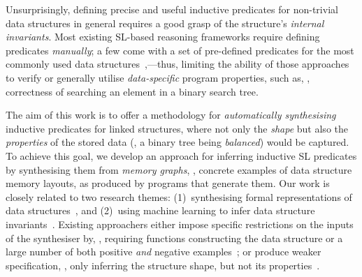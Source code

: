 %
%
Unsurprisingly, defining precise and useful inductive predicates for
non-trivial data structures in general requires a good grasp of the
structure's \emph{internal invariants}.
%
Most existing SL-based reasoning frameworks require
defining predicates \emph{manually};
%
a few come with a set of pre-defined predicates for the most commonly
used data structures~\cite{Calcagno-al:JACM11,le2019sling},---thus, limiting the
ability of those approaches to verify or generally utilise \emph{data-specific} program
properties, such as, \eg, correctness of searching
an element in a binary search tree.



The aim of this work is to offer a methodology for \emph{automatically
  synthesising} inductive predicates for linked structures, where not
only the \emph{shape} but also the \emph{properties} of the stored
data (\eg, a binary tree being \emph{balanced}) would be captured.
%
To achieve this goal, we develop an approach for inferring inductive
SL predicates by synthesising them from \emph{memory graphs}, \ie,
concrete examples of data structure memory layouts, as produced by
programs that generate them.
%
Our work is closely related to two research themes: (1)~synthesising
formal representations of data
structures~\cite{guo2007shape,zhu2016automatically,LPAR23:Learning_Data_Structure_Shapes,molina2021evospex},
and (2)~using machine learning to infer data structure
invariants~\cite{brockschmidt2017learning,molina2019training,DBLP:conf/spin/UsmanWWYDK19}.
%
Existing approachers either impose specific restrictions on the inputs
of the synthesiser by, \eg, requiring functions constructing the data
structure \cite{zhu2016automatically,molina2021evospex} or a large
number of both positive \emph{and} negative
examples~\cite{molina2019training,DBLP:conf/spin/UsmanWWYDK19}; or
produce weaker specification, \eg, only inferring the structure shape,
but not its
properties~\cite{guo2007shape,LPAR23:Learning_Data_Structure_Shapes}.
%

